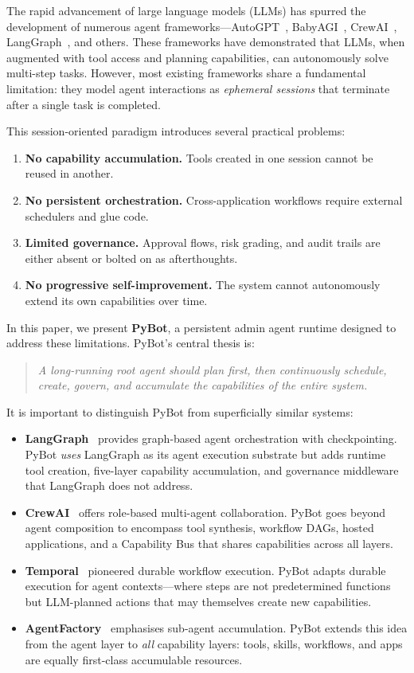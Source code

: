 \documentclass[11pt,a4paper]{article}
\begin{document}
The rapid advancement of large language models (LLMs) has spurred the development of numerous agent frameworks---AutoGPT~\cite{autogpt2023}, BabyAGI~\cite{babyagi2023}, CrewAI~\cite{crewai2024}, LangGraph~\cite{langgraph2024}, and others.
These frameworks have demonstrated that LLMs, when augmented with tool access and planning capabilities, can autonomously solve multi-step tasks.
However, most existing frameworks share a fundamental limitation: they model agent interactions as \emph{ephemeral sessions} that terminate after a single task is completed.

This session-oriented paradigm introduces several practical problems:
\begin{enumerate}[label=(\alph*)]
  \item \textbf{No capability accumulation.} Tools created in one session cannot be reused in another.
  \item \textbf{No persistent orchestration.} Cross-application workflows require external schedulers and glue code.
  \item \textbf{Limited governance.} Approval flows, risk grading, and audit trails are either absent or bolted on as afterthoughts.
  \item \textbf{No progressive self-improvement.} The system cannot autonomously extend its own capabilities over time.
\end{enumerate}

In this paper, we present \textbf{PyBot}, a persistent admin agent runtime designed to address these limitations.
PyBot's central thesis is:

\begin{quote}
\emph{A long-running root agent should plan first, then continuously schedule, create, govern, and accumulate the capabilities of the entire system.}
\end{quote}

\noindent It is important to distinguish PyBot from superficially similar systems:
\begin{itemize}
  \item \textbf{LangGraph}~\cite{langgraph2024} provides graph-based agent orchestration with checkpointing.  PyBot \emph{uses} LangGraph as its agent execution substrate but adds runtime tool creation, five-layer capability accumulation, and governance middleware that LangGraph does not address.
  \item \textbf{CrewAI}~\cite{crewai2024} offers role-based multi-agent collaboration.  PyBot goes beyond agent composition to encompass tool synthesis, workflow DAGs, hosted applications, and a Capability Bus that shares capabilities across all layers.
  \item \textbf{Temporal}~\cite{temporal2023} pioneered durable workflow execution.  PyBot adapts durable execution for agent contexts---where steps are not predetermined functions but LLM-planned actions that may themselves create new capabilities.
  \item \textbf{AgentFactory}~\cite{agentfactory2024} emphasises sub-agent accumulation.  PyBot extends this idea from the agent layer to \emph{all} capability layers: tools, skills, workflows, and apps are equally first-class accumulable resources.
\end{itemize}
\end{document}
